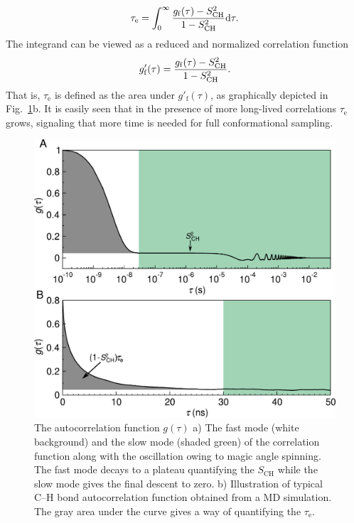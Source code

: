 \documentclass[journal=jpcbfk,manuscript=article,layout=twocolumn]{achemso}
\begin{document}
\begin{equation}
\label{eq:teff}
\tau_\mathrm{e}=\int_{0}^{\infty}\frac{g_{\mathrm{f}}(\tau)-S^{2}_{\rm{CH}}}{1-S^2_{\mathrm{CH}}}\mathrm d\tau.
\end{equation}
The integrand can be viewed as a reduced and normalized correlation function
\begin{equation}
\label{eq:nBCF}
g'_{\mathrm{f}}(\tau)=\frac{g_{\mathrm{f}}(\tau)-S^{2}_{\rm{CH}}}{1-S^2_{\mathrm{CH}}}.
\end{equation}
That is, $\tau_\mathrm e$ is defined as the area under $g'_{\mathrm{f}}(\tau)$, as
graphically depicted in Fig.~\ref{fig:schem_teff}b.
It is easily seen that in the presence of more long-lived correlations $\tau_\mathrm{e}$ grows, signaling that more time is needed for full conformational sampling.  

\begin{figure}[t]
\includegraphics[scale=0.45]{./figures/gfun_draft.pdf} 
\caption{The autocorrelation function $g(\tau)$ a) The fast mode (white background) and the slow mode (shaded green) of the correlation function along with the oscillation owing to magic angle spinning. The fast mode decays to a plateau quantifying the $S_{\mathrm{CH}}$ while the slow mode gives the final descent to zero. b) Illustration of typical C--H bond autocorrelation function obtained from a MD simulation. The gray area under the curve gives a way of quantifying the $\tau_\mathrm{e}$. }
\label{fig:schem_teff}

\end{figure} 
\end{document}

